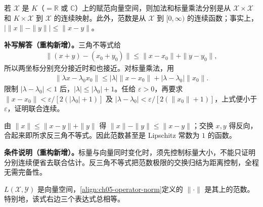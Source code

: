 \documentclass[../../main.tex]{subfiles}
\begin{document}
\begin{exercise}\label{exercise:ch05-vector-operations}
若 $\mathcal X$ 是 $K$（$=\mathbb R$ 或 $\mathbb C$）上的赋范向量空间，则加法和标量乘法分别是从 $\mathcal X\times\mathcal X$ 和 $K\times\mathcal X$ 到 $\mathcal X$ 的连续映射。此外，范数是从 $\mathcal X$ 到 $[0,\infty)$ 的连续函数；事实上，$|\|x\|-\|y\||\le\|x-y\|$。
\end{exercise}
\begin{solution}
\textbf{补写解答（重构新增）。}三角不等式给
\begin{align*}
\|(x+y)-(x_0+y_0)\|\le\|x-x_0\|+\|y-y_0\|,
\end{align*}
所以两坐标分别充分接近时和也接近。对标量乘法，用
\begin{align*}
\|\lambda x-\lambda_0x_0\|
\le |\lambda|\|x-x_0\|+|\lambda-\lambda_0|\|x_0\|.
\end{align*}
限制 $|\lambda-\lambda_0|<1$ 后，$|\lambda|\le|\lambda_0|+1$。任给 $\varepsilon>0$，再要求 $\|x-x_0\|<\varepsilon/[2(|\lambda_0|+1)]$ 及 $|\lambda-\lambda_0|<\varepsilon/[2(\|x_0\|+1)]$，上式便小于 $\varepsilon$，证明联合连续。

由 $\|x\|\le\|x-y\|+\|y\|$ 得 $\|x\|-\|y\|\le\|x-y\|$；交换 $x,y$ 得反向，合起来即所求反三角不等式。因此范数甚至是 Lipschitz 常数为 $1$ 的函数。
\end{solution}
\begin{remark}
\textbf{条件说明（重构新增）。}标量与向量同时变化时，须先控制标量大小，不能只证明分别连续便省去联合估计。反三角不等式把范数极限的交换归结为距离控制，全程无需完备性。
\end{remark}
\begin{exercise}\label{exercise:ch05-operator-norm}
$L(\mathcal X,\mathcal Y)$ 是向量空间，\eqref{align:ch05-operator-norm}定义的 $\|\cdot\|$ 是其上的范数。特别地，该式右边三个表达式总相等。
\end{exercise}
\end{document}
